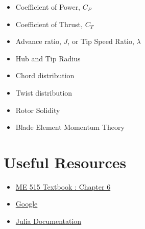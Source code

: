 \documentclass[12pt]{article}
\begin{document}
\begin{multicols}{2}
	\begin{itemize}
		\item Coefficient of Power, $C_P$
		\item Coefficient of Thrust, $C_T$
		\item Advance ratio, $J$, or Tip Speed Ratio, $\lambda$
		\item Hub and Tip Radius
		\item Chord distribution
		\item Twist distribution
		\item Rotor Solidity
		\item Blade Element Momentum Theory
	\end{itemize}
\end{multicols}


\section{Useful Resources}
\begin{itemize}
   		\item \href{https://byu.box.com/shared/static/ywfayozbj3sr2ot6b32u8nqk5brqvurt.pdf}{ME 515 Textbook : Chapter 6}
   		\item \href{https://www.google.com/}{Google}
   		\item \href{https://docs.julialang.org/en/v1/}{Julia Documentation}
\end{itemize}
	
	
	
\end{document}
